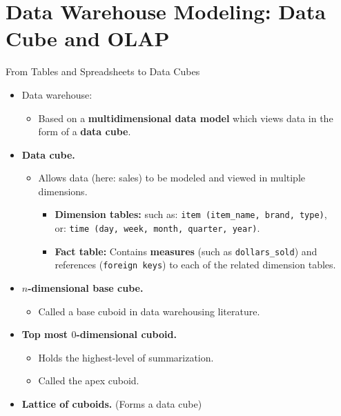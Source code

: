 \section{Data Warehouse Modeling: Data Cube and OLAP}


\begin{frame}{From Tables and Spreadsheets to Data Cubes}
	\begin{itemize}
		\item Data warehouse:
		      \begin{itemize}
			      \item Based on a \textbf{\color{airforceblue}multidimensional data model} which views data in the form of a \textbf{data cube}.
		      \end{itemize}
		\item \textbf{Data cube.}
		      \begin{itemize}
			      \item Allows data (here: sales) to be modeled and viewed in multiple dimensions.
			            \begin{itemize}
				            \item \textbf{Dimension tables:} such as: \texttt{item (item\_name, brand, type)},\\
				                  or: \texttt{time (day, week, month, quarter, year)}.
				            \item \textbf{Fact table:} Contains \textbf{measures} (such as \texttt{dollars\_sold}) and references (\texttt{foreign keys}) to each of the related dimension tables.
			            \end{itemize}
		      \end{itemize}
		\item \textbf{$n$-dimensional base cube.}
		      \begin{itemize}
			      \item Called a base cuboid in data warehousing literature.
		      \end{itemize}
		\item \textbf{Top most $0$-dimensional cuboid.}
		      \begin{itemize}
			      \item Holds the highest-level of summarization.
			      \item Called the apex cuboid.
		      \end{itemize}
		\item \textbf{Lattice of cuboids.} (Forms a data cube)
	\end{itemize}
\end{frame}

